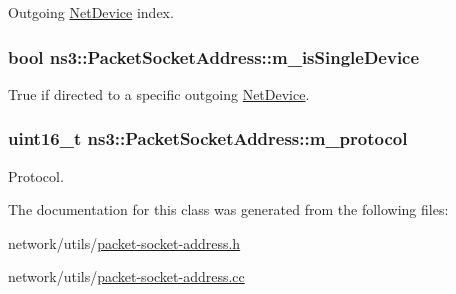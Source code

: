 Outgoing \hyperlink{classns3_1_1NetDevice}{Net\+Device} index. 

\subsubsection[{\texorpdfstring{m\+\_\+is\+Single\+Device}{m_isSingleDevice}}]{\setlength{\rightskip}{0pt plus 5cm}bool ns3\+::\+Packet\+Socket\+Address\+::m\+\_\+is\+Single\+Device\hspace{0.3cm}{\ttfamily [private]}}\hypertarget{classns3_1_1PacketSocketAddress_a96c62833941b0d645a43dfe4f4668a3a}{}\label{classns3_1_1PacketSocketAddress_a96c62833941b0d645a43dfe4f4668a3a}


True if directed to a specific outgoing \hyperlink{classns3_1_1NetDevice}{Net\+Device}. 

\subsubsection[{\texorpdfstring{m\+\_\+protocol}{m_protocol}}]{\setlength{\rightskip}{0pt plus 5cm}uint16\+\_\+t ns3\+::\+Packet\+Socket\+Address\+::m\+\_\+protocol\hspace{0.3cm}{\ttfamily [private]}}\hypertarget{classns3_1_1PacketSocketAddress_adfd7dd5b6fb703aa70e379b9d6ec247c}{}\label{classns3_1_1PacketSocketAddress_adfd7dd5b6fb703aa70e379b9d6ec247c}


Protocol. 



The documentation for this class was generated from the following files\+:\begin{DoxyCompactItemize}
\item 
network/utils/\hyperlink{packet-socket-address_8h}{packet-\/socket-\/address.\+h}\item 
network/utils/\hyperlink{packet-socket-address_8cc}{packet-\/socket-\/address.\+cc}\end{DoxyCompactItemize}
